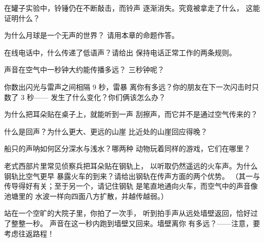\begin{exercise}[$\star$]\label{exo:g4:how-sound-travels:2}
在罐子实验中，铃锤仍在不断敲击，而铃声
逐渐消失。究竟被拿走了什么，
这能证明什么？
\end{exercise}

\begin{exercise}[$\star$]\label{exo:g4:how-sound-travels:3}
为什么月球是一个无声的世界？
请用本章的命题作答。
\end{exercise}

\begin{exercise}[$\star$]\label{exo:g4:how-sound-travels:4}
在线电话中，什么传递了低语声？请给出
保持电话正常工作的两条规则。
\end{exercise}

\begin{exercise}[$\star$]\label{exo:g4:how-sound-travels:5}
声音在空气中一秒钟大约能传播多远？
三秒钟呢？
\end{exercise}

\begin{exercise}[$\star$]\label{exo:g4:how-sound-travels:6}
你数出闪光与雷声之间相隔 9 秒，雷暴
离你有多远？你的朋友在下一次闪击时只数了 3 秒——
发生了什么变化？你们俩该怎么办？
\end{exercise}

\begin{exercise}[$\star$]\label{exo:g4:how-sound-travels:7}
为什么把耳朵贴在桌子上，就能听到一声
刮擦声，而它并不是通过空气传来的？
\end{exercise}

\begin{exercise}[$\star$]\label{exo:g4:how-sound-travels:8}
什么是回声？为什么更大、更远的山崖
比近处的山崖回应得晚？
\end{exercise}

\begin{exercise}[$\star$]\label{exo:g4:how-sound-travels:9}
船只的声呐如何区分深水与浅水？哪两种
动物玩着同样的游戏，它们在哪里？
\end{exercise}

\begin{exercise}[$\star\star$]\label{exo:g4:how-sound-travels:10}
老式西部片里常见侦察兵把耳朵贴在钢轨上，
以听取仍然遥远的火车声。为什么钢轨比空气更早
暴露火车的到来？请给出钢轨在传声方面的两个优势。
（其一与传导得好有关；至于另一个，请记住钢轨
是笔直地通向火车，而空气中的声音像池塘里的
水波一样向四面八方扩散，并越传越弱。）
\end{exercise}

\begin{exercise}[$\star\star$]\label{exo:g4:how-sound-travels:11}
站在一个空旷的大院子里，你拍了一次手，
听到拍手声从远处墙壁返回，恰好过了整整一秒。
声音在这一秒内跑到墙壁又回来。墙壁离你
有多远？——注意，要考虑往返路程！
\end{exercise}
